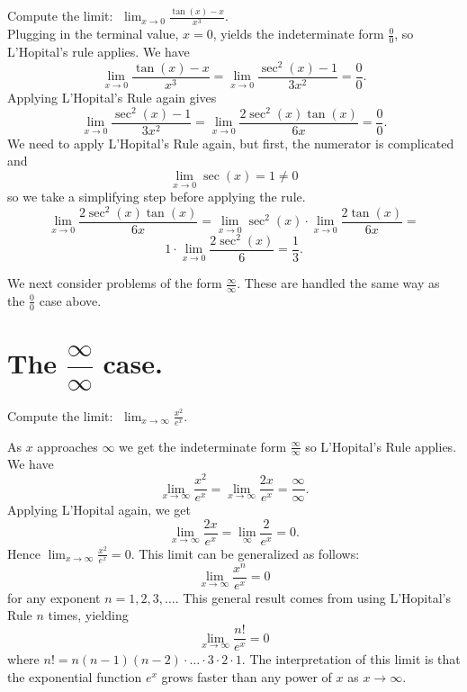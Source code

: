 \documentclass[handout]{ximera}
\begin{document}
\begin{example}[example 5]
Compute the limit:  $\displaystyle{\;\lim_{x \to 0} \frac{\tan(x)-x}{x^3}}.$\\
Plugging in the terminal value, $x=0$, yields 
the indeterminate form $\frac00$, so L'Hopital's rule applies.
We have 
\[\lim_{x \to 0} \frac{\tan(x)-x}{x^3} = \lim_{x \to 0} \frac{\sec^2(x)-1}{3x^2} = \frac{0}{0}.\]
Applying L'Hopital's Rule again gives
\[\lim_{x \to 0} \frac{\sec^2(x)-1}{3x^2} = \lim_{x \to 0} \frac{2\sec^2(x)\tan(x)}{6x} = \frac{0}{0}.\]	
We need to apply L'Hopital's Rule again, but first, the numerator is complicated and 								
\[\lim_{x \to 0} \sec(x) = 1 \neq 0\]
so we take a simplifying step before applying the rule.
\[\lim_{x \to 0} \frac{2\sec^2(x)\tan(x)}{6x} = 
\lim_{x \to 0} \sec^2(x) \cdot \lim_{x \to 0} \frac{2\tan(x)}{6x}=\]
 \[1\cdot \lim_{x \to 0} \frac{2\sec^2(x)}{6} =\frac{1}{3}.\]
\end{example}


We next consider problems of the form $\frac{\infty}{\infty}$.  These are handled the same way as the $\frac00$ case above.



\section{ The $\dfrac{\infty}{\infty}$ case.}



\begin{example}[example 6]
Compute the limit:  $\displaystyle{\;\lim_{x \to \infty} \frac{x^2}{e^x}}.$

As $x$ approaches $\infty$ we get the indeterminate form $\frac{\infty}{\infty}$ so L'Hopital's Rule applies.
We have 
\[\lim_{x\to \infty} \frac{x^2}{e^x} = \lim_{x \to \infty} \frac{2x}{e^x} = \frac{\infty}{\infty}.\]
Applying L'Hopital again, we get
\[\lim_{x \to \infty} \frac{2x}{e^x} = \lim_{\infty} \frac{2}{e^x} = 0.\]
Hence $\lim_{x\to\infty}\frac{x^2}{e^x}=0$.  
This limit can be generalized as follows:
\[\lim_{x\to\infty}\frac{x^n}{e^x} =0\]
for any exponent $n = 1, 2, 3, \dots$.
This general result comes from using L'Hopital's Rule $n$ times, yielding
\[\lim_{x\to\infty} \frac{n!}{e^x} =0\]
where $n! = n(n-1)(n-2)\cdot \dots \cdot 3\cdot 2\cdot 1$.
The interpretation of this limit is that the exponential function $e^x$ grows faster than any power of $x$ as $x \to \infty$.
\end{example}
\end{document}
